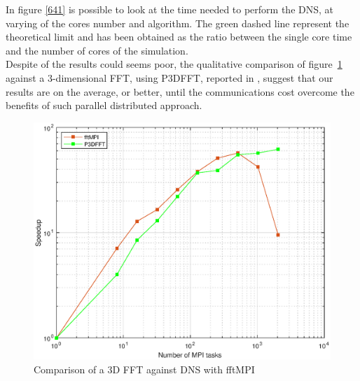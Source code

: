 In figure \ref{641} is possible to look at the time needed to perform the DNS, at varying of the cores number and algorithm.
The green dashed line represent the theoretical limit and has been obtained as the ratio between the single core time and the number of cores of the simulation.  \\
Despite of the results could seems poor, the qualitative comparison of figure~\ref{643} against a 3-dimensional FFT, using P3DFFT, reported in \cite[43]{tesi:brach}, suggest that our results are on the average, or better, until the communications cost overcome the benefits of such parallel distributed approach.

\begin{figure}
\begin{center}
\includegraphics[scale=0.55]{grafici/643}
\caption{Comparison of a 3D FFT against DNS with fftMPI}
\label{643}
\end{center}
\end{figure}

